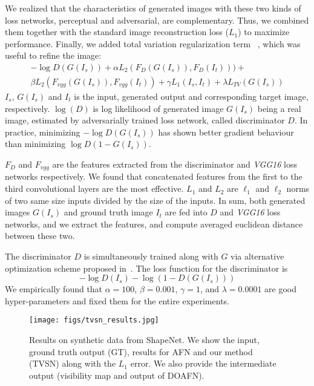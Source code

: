 \documentclass[10pt,twocolumn,letterpaper]{article}
\begin{document}
We realized that the characteristics of generated images with these two kinds of loss networks, perceptual and adversarial, are complementary. Thus, we combined them together with the standard image reconstruction loss ($L_1$) to maximize performance. Finally, we added total variation regularization term ~\cite{johnson_eccv2016}, which was useful to refine the image:
\begin{multline}
-\log D(G(I_s)) + \alpha L_{2}(F_{D}(G(I_s)), F_{D}(I_t)) ) + \\
\beta L_{2}(F_{vgg}(G(I_s)), F_{vgg}(I_t)) + \gamma L_1(I_s,I_t) + \lambda L_{TV}(G(I_s))
\end{multline}
$I_s$, $G(I_s)$ and $I_t$ is the input, generated output and corresponding target image, respectively. $\log(D)$ is log likelihood of generated image $G(I_s)$ being a real image, estimated by adversarially trained loss network, called discriminator $D$. In practice, minimizing $-\log D(G(I_s))$ has shown better gradient behaviour than minimizing $\log D(1 - G(I_s))$.

$F_D$ and $F_{vgg}$ are the features extracted from the discriminator and \textit{VGG16} loss networks respectively. We found that concatenated features from the first to the third convolutional layers are the most effective. $L_1$ and $L_2$ are $\ell_1$ and $\ell_2$ norms of two same size inputs divided by the size of the inputs. In sum, both generated images $G(I_s)$ and ground truth image $I_t$ are fed into $D$ and \textit{VGG16} loss networks, and we extract the features, and compute averaged euclidean distance between these two. 

The discriminator $D$ is simultaneously trained along with $G$ via alternative optimization scheme proposed in~\cite{Goodfellow_nips2014}. The loss function for the discriminator is 
\begin{equation}
-\log D(I_s) - \log (1-D(G(I_s)))
\end{equation}
We empirically found that $\alpha=100$, $\beta=0.001$, $\gamma=1$, and $\lambda=0.0001$ are good hyper-parameters and fixed them for the entire experiments.

\begin{figure}[t]
\begin{center}
\texttt{[image: figs/tvsn\_results.jpg]}
\end{center}
\caption{Results on synthetic data from ShapeNet. We show the input, ground truth output (GT), results for AFN and our method (TVSN) along with the $L_1$ error. We also provide the intermediate output (visibility map and output of DOAFN).}
\label{fig:tvsn_results}
\vspace{-2mm}
\vspace{-2mm}
\end{figure}
\end{document}
